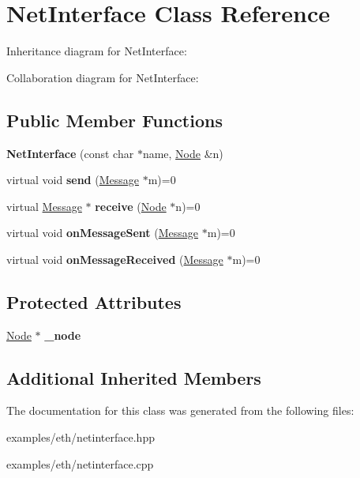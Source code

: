\hypertarget{classNetInterface}{}\section{Net\+Interface Class Reference}
\label{classNetInterface}


Inheritance diagram for Net\+Interface\+:


Collaboration diagram for Net\+Interface\+:
\subsection*{Public Member Functions}
\begin{DoxyCompactItemize}
\item 
{\bfseries Net\+Interface} (const char $\ast$name, \hyperlink{classNode}{Node} \&n)\hypertarget{classNetInterface_aef197a87b6a50a50065f2a8e541a2f12}{}\label{classNetInterface_aef197a87b6a50a50065f2a8e541a2f12}

\item 
virtual void {\bfseries send} (\hyperlink{classMessage}{Message} $\ast$m)=0\hypertarget{classNetInterface_a748fa5cca278cbc1d3ae781c0bc54773}{}\label{classNetInterface_a748fa5cca278cbc1d3ae781c0bc54773}

\item 
virtual \hyperlink{classMessage}{Message} $\ast$ {\bfseries receive} (\hyperlink{classNode}{Node} $\ast$n)=0\hypertarget{classNetInterface_a41ec576dbc0659e94ceebc0fe1ca0c11}{}\label{classNetInterface_a41ec576dbc0659e94ceebc0fe1ca0c11}

\item 
virtual void {\bfseries on\+Message\+Sent} (\hyperlink{classMessage}{Message} $\ast$m)=0\hypertarget{classNetInterface_a0a0a209ea97a58d9f25da31cd79acca0}{}\label{classNetInterface_a0a0a209ea97a58d9f25da31cd79acca0}

\item 
virtual void {\bfseries on\+Message\+Received} (\hyperlink{classMessage}{Message} $\ast$m)=0\hypertarget{classNetInterface_a5be61ffec4bef44914b47cf948c65f87}{}\label{classNetInterface_a5be61ffec4bef44914b47cf948c65f87}

\end{DoxyCompactItemize}
\subsection*{Protected Attributes}
\begin{DoxyCompactItemize}
\item 
\hyperlink{classNode}{Node} $\ast$ {\bfseries \+\_\+node}\hypertarget{classNetInterface_afea6944932a3126b4eec0b3afaa1a7a3}{}\label{classNetInterface_afea6944932a3126b4eec0b3afaa1a7a3}

\end{DoxyCompactItemize}
\subsection*{Additional Inherited Members}


The documentation for this class was generated from the following files\+:\begin{DoxyCompactItemize}
\item 
examples/eth/netinterface.\+hpp\item 
examples/eth/netinterface.\+cpp\end{DoxyCompactItemize}
